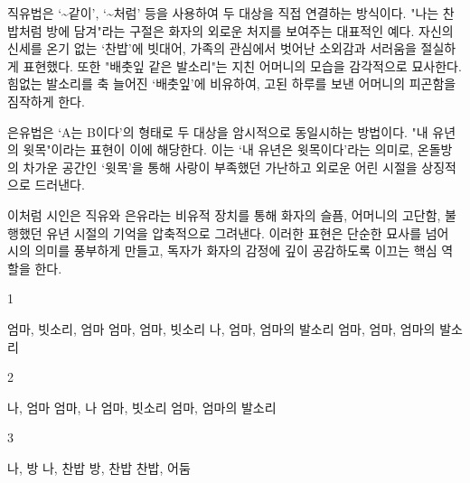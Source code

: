 \documentclass[fs9,seriesRus]{korfarm-base}
\begin{document}
{직유법은 ‘\textasciitilde{}같이’, ‘\textasciitilde{}처럼’ 등을 사용하여 두 대상을 직접 연결하는 방식이다. "나는 찬밥처럼 방에 담겨"라는 구절은 화자의 외로운 처지를 보여주는 대표적인 예다. 자신의 신세를 온기 없는 ‘찬밥’에 빗대어, 가족의 관심에서 벗어난 소외감과 서러움을 절실하게 표현했다. 또한 "배춧잎 같은 발소리"는 지친 어머니의 모습을 감각적으로 묘사한다. 힘없는 발소리를 축 늘어진 ‘배춧잎’에 비유하여, 고된 하루를 보낸 어머니의 피곤함을 짐작하게 한다.

은유법은 ‘A는 B이다’의 형태로 두 대상을 암시적으로 동일시하는 방법이다. "내 유년의 윗목"이라는 표현이 이에 해당한다. 이는 ‘내 유년은 윗목이다’라는 의미로, 온돌방의 차가운 공간인 ‘윗목’을 통해 사랑이 부족했던 가난하고 외로운 어린 시절을 상징적으로 드러낸다.

이처럼 시인은 직유와 은유라는 비유적 장치를 통해 화자의 슬픔, 어머니의 고단함, 불행했던 유년 시절의 기억을 압축적으로 그려낸다. 이러한 표현은 단순한 묘사를 넘어 시의 의미를 풍부하게 만들고, 독자가 화자의 감정에 깊이 공감하도록 이끄는 핵심 역할을 한다.
}


\kfActivityBg \par{}
\par{}\par\nopagebreak[4]\smallskip\nopagebreak[4]
\kfBeginMC
\begin{kfSentenceUnit}{1}{}
\begin{kfChoices}
\kfChoice 엄마, 빗소리, 엄마
\kfChoice 엄마, 엄마, 빗소리
\kfChoice 나, 엄마, 엄마의 발소리
\kfChoice 엄마, 엄마, 엄마의 발소리
\end{kfChoices}
\end{kfSentenceUnit}

\begin{kfSentenceUnit}{2}{}
\begin{kfChoices}
\kfChoice 나, 엄마
\kfChoice 엄마, 나
\kfChoice 엄마, 빗소리
\kfChoice 엄마, 엄마의 발소리
\end{kfChoices}
\end{kfSentenceUnit}

\begin{kfSentenceUnit}{3}{}
\begin{kfChoices}
\kfChoice 나, 방
\kfChoice 나, 찬밥
\kfChoice 방, 찬밥
\kfChoice 찬밥, 어둠
\end{kfChoices}
\end{kfSentenceUnit}
\end{document}
